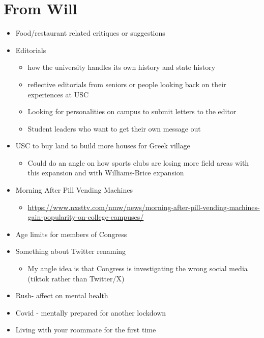 \documentclass{article}
\begin{document}
\section*{From Will}

\begin{itemize}
\item
  Food/restaurant related critiques or suggestions
\item
  Editorials

  \begin{itemize}
  \item
    how the university handles its own history and state history
  \item
    reflective editorials from seniors or people looking back on their
    experiences at USC
  \item
    Looking for personalities on campus to submit letters to the editor
  \item
    Student leaders who want to get their own message out
  \end{itemize}
\end{itemize}

\begin{itemize}
\item
  USC to buy land to build more houses for Greek village

  \begin{itemize}
  \item
    Could do an angle on how sports clubs are losing more field areas
    with this expansion and with Williams-Brice expansion~
  \end{itemize}
\end{itemize}

\begin{itemize}
\item
  Morning After Pill Vending Machines

  \begin{itemize}
  \item
    \url{https://www.nxsttv.com/nmw/news/morning-after-pill-vending-machines-gain-popularity-on-college-campuses/}
  \end{itemize}
\item
  Age limits for members of Congress~
\item
  Something about Twitter renaming

  \begin{itemize}
  \item
    My angle idea is that Congress is investigating the wrong social
    media (tiktok rather than Twitter/X)
  \end{itemize}
\item
  Rush- affect on mental health
\item
  Covid - mentally prepared for another lockdown
\item
  Living with your roommate for the first time
\end{itemize}
\end{document}
